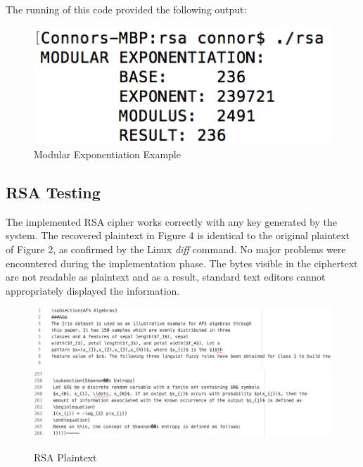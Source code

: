 \documentclass[]{article}
\begin{document}
\vspace{0.2cm}
\noindent
The running of this code provided the following output:

\begin{figure}[H]
		\centering
	\includegraphics[height=\textheight/10,width=\textwidth/3]{exponentiation.png}
	\caption{Modular Exponentiation Example}
\end{figure}

\pagebreak

\vspace*{-0.8cm}

\subsection*{RSA Testing}

The implemented RSA cipher works correctly with any key generated by the system. The recovered plaintext in Figure 4 is identical to the original plaintext of Figure 2, as confirmed by the Linux \textit{diff} command. No major problems were encountered during the implementation phase. The bytes visible in the ciphertext are not readable as plaintext and as a result, standard text editors cannot appropriately displayed the information.

\vspace{0.5cm}
\begin{figure}[H]
	\includegraphics[height=\textheight/6,width=\textwidth]{rsa_plain1.png}
	\includegraphics[height=\textheight/6,width=\textwidth]{rsa_plain2.png}	
	\caption{RSA Plaintext}
	\centering
\end{figure}
\end{document}

